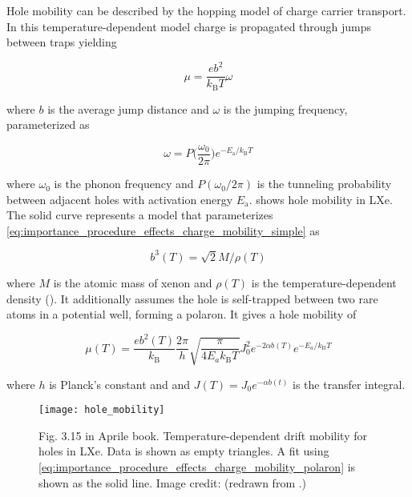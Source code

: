 Hole mobility can be described by the hopping model of charge carrier transport.  In this temperature-dependent model charge is
propagated through jumps between traps yielding

\begin{equation}
\mu = \frac{e b^2}{k_{\mathrm{B}} T} \omega
\label{eq:importance_procedure_effects_charge_mobility_simple}
\end{equation}

\noindent where $b$ is the average jump distance and $\omega$ is the jumping frequency, parameterized as

\begin{equation}
\omega = P \Big( \frac{\omega_0}{2 \pi} \Big) e^{-E_{\mathrm{a}} / k_{\mathrm{B}} T}
\end{equation}

\noindent where $\omega_0$ is the phonon frequency and $P(\omega_0 / 2 \pi)$ is the tunneling probability between adjacent holes with
activation energy $E_{\mathrm{a}}$.   shows hole mobility in
LXe.  The solid curve represents a model that parameterizes \eqref{eq:importance_procedure_effects_charge_mobility_simple} as

\begin{equation}
b^3(T) = \sqrt{2} M / \rho (T)
\end{equation}

\noindent where $M$ is the atomic mass of xenon and $\rho (T)$ is the temperature-dependent density ().  It
additionally assumes the hole is self-trapped between two rare atoms in a potential well, forming a polaron.  It gives a hole mobility of

\begin{equation}
\mu (T) = \frac{e b^2 (T)}{k_{\mathrm{B}}} \frac{2 \pi}{h} \sqrt{\frac{\pi}{4 E_a k_{\mathrm{B}} T}} J_0^2
e^{-2 \alpha b(T)} e^{-E_a / k_{\mathrm{B}} T}
\label{eq:importance_procedure_effects_charge_mobility_polaron}
\end{equation}

\noindent where $h$ is Planck's constant and and $J(T) = J_0 e^{-\alpha b(t)}$ is the transfer integral.

\begin{figure}
\centering
\texttt{[image: hole\_mobility]}
\caption{Fig. 3.15 in Aprile book.  Temperature-dependent drift mobility for holes in LXe.  Data is shown as empty triangles.  A fit
using \eqref{eq:importance_procedure_effects_charge_mobility_polaron} is shown as the solid line.  Image credit: 
(redrawn from .)}
\label{fig:importance_procedure_effects_charge_hole_mobility}
\end{figure}

